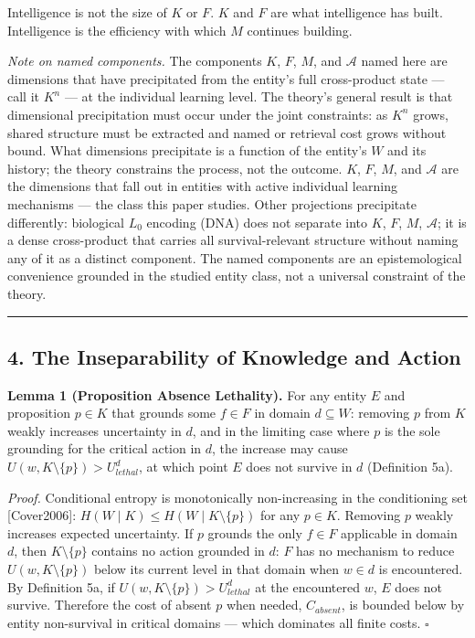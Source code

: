 \documentclass[
]{article}
\begin{document}
Intelligence is not the size of \(K\) or \(F\). \(K\) and \(F\) are what
intelligence has built. Intelligence is the efficiency with which \(M\)
continues building.

\emph{Note on named components.} The components \(K\), \(F\), \(M\), and
\(\mathcal{A}\) named here are dimensions that have precipitated from
the entity's full cross-product state --- call it \(K^n\) --- at the
individual learning level. The theory's general result is that
dimensional precipitation must occur under the joint constraints: as
\(K^n\) grows, shared structure must be extracted and named or retrieval
cost grows without bound. What dimensions precipitate is a function of
the entity's \(W\) and its history; the theory constrains the process,
not the outcome. \(K\), \(F\), \(M\), and \(\mathcal{A}\) are the
dimensions that fall out in entities with active individual learning
mechanisms --- the class this paper studies. Other projections
precipitate differently: biological \(L_0\) encoding (DNA) does not
separate into \(K\), \(F\), \(M\), \(\mathcal{A}\); it is a dense
cross-product that carries all survival-relevant structure without
naming any of it as a distinct component. The named components are an
epistemological convenience grounded in the studied entity class, not a
universal constraint of the theory.

\begin{center}\rule{0.5\linewidth}{0.5pt}\end{center}

\subsection{4. The Inseparability of Knowledge and
Action}\label{the-inseparability-of-knowledge-and-action}

\textbf{Lemma 1 (Proposition Absence Lethality).} For any entity \(E\)
and proposition \(p \in K\) that grounds some \(f \in F\) in domain
\(d \subseteq W\): removing \(p\) from \(K\) weakly increases
uncertainty in \(d\), and in the limiting case where \(p\) is the sole
grounding for the critical action in \(d\), the increase may cause
\(U(w, K \setminus \{p\}) > U_{lethal}^d\), at which point \(E\) does
not survive in \(d\) (Definition 5a).

\emph{Proof.} Conditional entropy is monotonically non-increasing in the
conditioning set {[}Cover2006{]}:
\(H(W \mid K) \leq H(W \mid K \setminus \{p\})\) for any \(p \in K\).
Removing \(p\) weakly increases expected uncertainty. If \(p\) grounds
the only \(f \in F\) applicable in domain \(d\), then
\(K \setminus \{p\}\) contains no action grounded in \(d\): \(F\) has no
mechanism to reduce \(U(w, K \setminus \{p\})\) below its current level
in that domain when \(w \in d\) is encountered. By Definition 5a, if
\(U(w, K \setminus \{p\}) > U_{lethal}^d\) at the encountered \(w\),
\(E\) does not survive. Therefore the cost of absent \(p\) when needed,
\(C_{absent}\), is bounded below by entity non-survival in critical
domains --- which dominates all finite costs. \(\square\)
\end{document}
